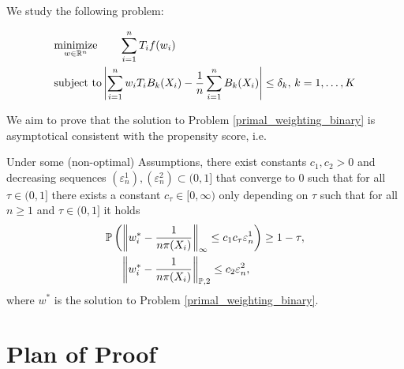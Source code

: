 We study the following problem:

\begin{align}
  \label{primal_weighting_binary}
  \begin{split}
    &\underset{w \in \mathbb{R}^n}{\text{minimize}}
    \qquad
    \sum_{i = 1}^{n} T_i f(w_i)
\\
    &\text{subject to}
    \left| 
      \sum_{i = 1}^{n} w_i T_i B_k(X_i)
      - 
      \frac{1}{n} \sum_{i = 1}^{n} B_k(X_i)
    \right|
    \le 
    \delta_k,\,
    k = 1, \ldots, K
  \end{split}
\end{align}

We aim to prove that the solution to 
Problem \eqref{primal_weighting_binary}
is asymptotical consistent with the propensity score, i.e.

\begin{theorem}
  \label{ch_theorem_1}
  Under some (non-optimal) Assumptions,
  there exist constants
  $
    c_{1}
    , 
    c_{2}
    >
    0
  $
  and decreasing sequences
  $
    (\varepsilon_n^1)
    ,
    (\varepsilon_n^2)
    \subset
    (0,1]
  $
  that converge to 0
  such that
  for all
  $
    \tau
    \in
    (0,1]
  $
  there exists a constant
  $
    c_{\tau}
    \in
    [0,\infty)
  $
  only depending on 
  $ \tau $
  such that for all 
  $ n \ge 1 $
  and
  $
    \tau
    \in
    (0,1]
  $
  it holds
  \begin{align*}
   & \mathbb{P}
    \left( 
  \left\lVert
    w^*_i
    -
    \frac{1}{n \pi(X_i)}
  \right\rVert_\infty
  \le 
  c_{1}
  c_{\tau}
  \varepsilon_{n}^1 
   \right)
   \ge
  1 - \tau
  ,
\\
   &\quad \
   \left\lVert
    w^*_i
    -
    \frac{1}{n \pi(X_i)}
  \right\rVert_{\mathbb{P}, 2}
  \le 
  c_{2}
  \varepsilon_n^{2},
  \end{align*}
  where 
  $w^*$
  is the solution to 
  Problem \eqref{primal_weighting_binary}.
\end{theorem}

\section*{Plan of Proof}

